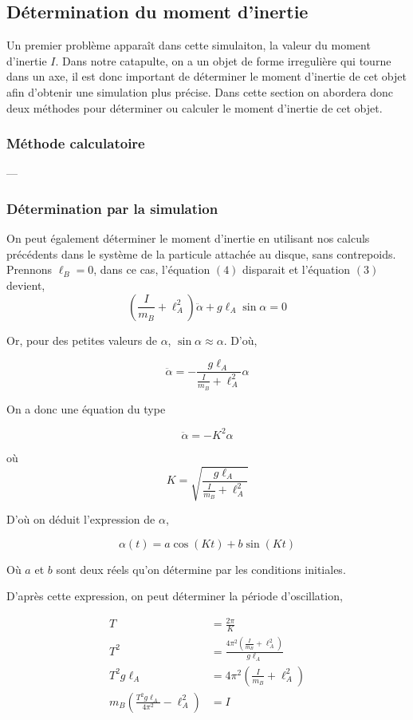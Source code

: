 \documentclass[10pt]{article}
\begin{document}
\pagebreak
\subsection{Détermination du moment d'inertie}

Un premier problème apparaît dans cette simulaiton, la valeur du moment d'inertie $I$. Dans notre catapulte, on a un objet
de forme irregulière qui tourne dans un axe, il est donc important de déterminer le moment d'inertie de cet objet afin d'obtenir
une simulation plus précise. Dans cette section on abordera donc deux méthodes pour déterminer ou calculer le moment d'inertie
de cet objet.

\subsubsection{Méthode calculatoire}
---

\subsubsection{Détermination par la simulation}

On peut également déterminer le moment d'inertie en utilisant nos calculs précédents dans le système de la particule attachée
au disque, sans contrepoids. Prennons $\ell_B = 0$, dans ce cas, l'équation $(4)$ disparait et l'équation $(3)$ devient,
$$
\left(\frac{I}{m_B}+\ell_A^2\right)\ddot{\alpha}+g\ell_A\sin{\alpha} = 0
$$

Or, pour des petites valeurs de $\alpha$, $\sin{\alpha} \approx \alpha$.
D'où,

$$
\ddot{\alpha} = -\frac{g\ell_A}{\frac{I}{m_B}+\ell_A^2}\alpha
$$

On a donc une équation du type

$$
\ddot{\alpha} = -K^2\alpha
$$

où $$K = \sqrt{\frac{g\ell_A}{\frac{I}{m_B}+\ell_A^2}}$$

D'où on déduit l'expression de $\alpha$,

$$
\alpha(t) = a\cos{(Kt)}+b\sin{(Kt)} 
$$

Où $a$ et $b$ sont deux réels qu'on détermine par les conditions initiales.

D'après cette expression, on peut déterminer la période d'oscillation,

\begin{align*}
T &= \frac{2\pi}{K} \\
T^2 &= \frac{4\pi^2\left(\frac{I}{m_B}+\ell_A^2\right)}{g\ell_A} \\
T^2g\ell_A &= 4\pi^2\left(\frac{I}{m_B}+\ell_A^2\right) \\
m_B\left(\frac{T^2g\ell_A}{4\pi^2}-\ell_A^2\right) &= I
\end{align*}
\end{document}
